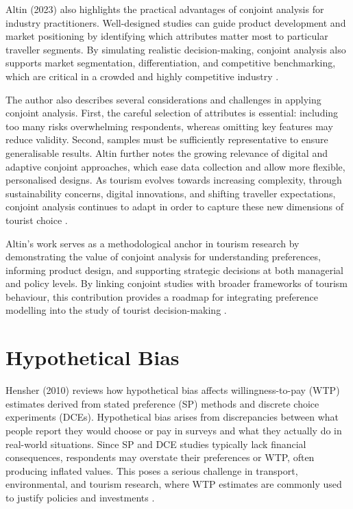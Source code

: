 \documentclass[a4paper, 12pt, twoside]{report}  %
\begin{document}
\indent Altin (2023) \cite{conjointaltin} also highlights the practical advantages of conjoint analysis for industry practitioners. Well-designed studies can guide product development and market positioning by identifying which attributes matter most to particular traveller segments. By simulating realistic decision-making, conjoint analysis also supports market segmentation, differentiation, and competitive benchmarking, which are critical in a crowded and highly competitive industry \cite{conjointaltin}.

\indent The author also describes several considerations and challenges in applying conjoint analysis. First, the careful selection of attributes is essential: including too many risks overwhelming respondents, whereas omitting key features may reduce validity. Second, samples must be sufficiently representative to ensure generalisable results. Altin further notes the growing relevance of digital and adaptive conjoint approaches, which ease data collection and allow more flexible, personalised designs. As tourism evolves towards increasing complexity, through sustainability concerns, digital innovations, and shifting traveller expectations, conjoint analysis continues to adapt in order to capture these new dimensions of tourist choice \cite{conjointaltin}.

\indent Altin’s work serves as a methodological anchor in tourism research by demonstrating the value of conjoint analysis for understanding preferences, informing product design, and supporting strategic decisions at both managerial and policy levels. By linking conjoint studies with broader frameworks of tourism behaviour, this contribution provides a roadmap for integrating preference modelling into the study of tourist decision-making \cite{conjointaltin}.

\section{Hypothetical Bias}

\indent Hensher (2010) reviews how hypothetical bias affects willingness-to-pay (WTP) estimates derived from stated preference (SP) methods and discrete choice experiments (DCEs). Hypothetical bias arises from discrepancies between what people report they would choose or pay in surveys and what they actually do in real-world situations. Since SP and DCE studies typically lack financial consequences, respondents may overstate their preferences or WTP, often producing inflated values. This poses a serious challenge in transport, environmental, and tourism research, where WTP estimates are commonly used to justify policies and investments \cite{hypotheticalbias}.
\end{document}
